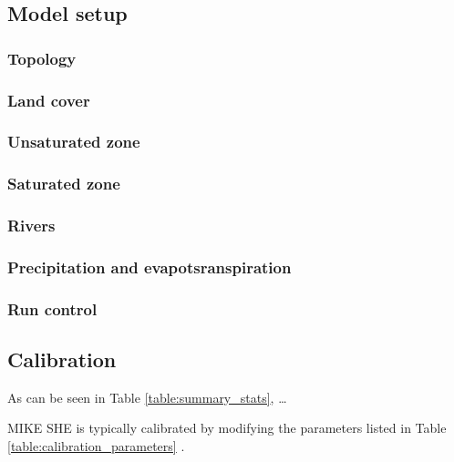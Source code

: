 \documentclass{article}
\begin{document}
\subsection{Model setup}

\subsubsection{Topology}

\subsubsection{Land cover}

\subsubsection{Unsaturated zone}

\subsubsection{Saturated zone}

\subsubsection{Rivers}

\subsubsection{Precipitation and evapotsranspiration}

\subsubsection{Run control}

\subsection{Calibration}

As can be seen in Table \ref{table:summary_stats}, \dots

MIKE SHE is typically calibrated by modifying the parameters listed in Table \ref{table:calibration_parameters} \parencite{refsgaard1997parameterisation, thompson2004simulation}.
\end{document}
